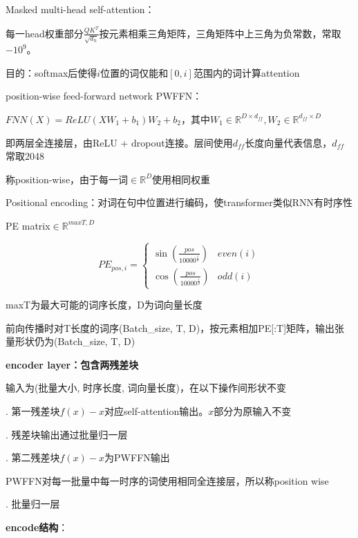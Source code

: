 \documentclass[UTF8]{ctexart}
\begin{document}
  \quad Masked multi-head self-attention：

  \quad \quad 每一head权重部分$\frac{QK^T}{\sqrt{d_h}}$按元素相乘三角矩阵，三角矩阵中上三角为负常数，常取$-10^9$。

  \quad \quad \quad 目的：softmax后使得$i$位置的词仅能和$[0, i]$范围内的词计算attention

  \quad position-wise feed-forward network PWFFN：

  \quad \quad $FNN(X) = ReLU(XW_1 + b_1)W_2 + b_2$，其中$W_1 \in \mathbb{R}^{D \times d_{ff}}, W_2 \in \mathbb{R}^{d_{ff} \times D}$

  \quad \quad 即两层全连接层，由ReLU + dropout连接。层间使用$d_{ff}$长度向量代表信息，$d_{ff}$常取2048

  \quad \quad 称position-wise，由于每一词$\in \mathbb{R}^D$使用相同权重

  \quad Positional encoding：对词在句中位置进行编码，使transformer类似RNN有时序性
  
  \quad \quad PE matrix$\in \mathbb{R}^{maxT, D}$
  
  \quad \quad \quad \begin{equation*}
      PE_{pos, i} = \begin{cases}
      \sin(\frac{pos}{10000^{\frac{i}{d}}}) & even(i)\\
      \cos(\frac{pos}{10000^{\frac{i}{d}}}) & odd(i)
      \end{cases}
    \end{equation*}
    
  \quad \quad \quad maxT为最大可能的词序长度，D为词向量长度
  
  \quad \quad \quad 前向传播时对T长度的词序(Batch\_size, T, D)，按元素相加PE[:T]矩阵，输出张量形状仍为(Batch\_size, T, D)
  
  \quad \textbf{encoder layer：包含两残差块}

  \quad \quad 输入为(批量大小, 时序长度, 词向量长度)，在以下操作间形状不变

  \quad {}. 第一残差块$f(x) - x$对应self-attention输出。$x$部分为原输入不变
  
  \quad {}. 残差块输出通过批量归一层

  \quad {}. 第二残差块$f(x) - x$为PWFFN输出

  \quad \quad \quad PWFFN对每一批量中每一时序的词使用相同全连接层，所以称position wise

  \quad {}. 批量归一层

  \quad \textbf{encode结构}：
\end{document}
